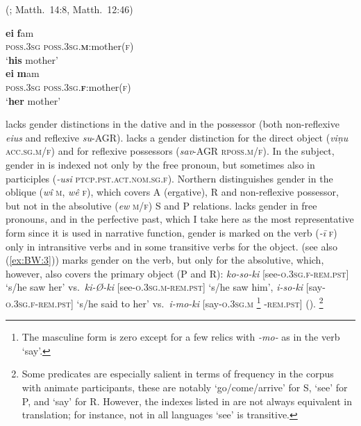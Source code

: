\documentclass[output=collectionpaper]{langsci/langscibook}
\begin{document}
\ea\label{ex:BW:15}
 (; Matth.~14:8, Matth.~12:46)\\
\begin{xlist}
\ex
\gll \textbf{ei} 	\textbf{f}am\\
\textsc{poss.3sg}	\textsc{poss.3sg.\textbf{m}}:mother(\textsc{f})\\
\glt ‘\textbf{his} mother’\\
\ex
\gll \textbf{ei} 	\textbf{m}am\\
\textsc{poss.3sg}	\textsc{poss.3sg.\textbf{f}}:mother(\textsc{f})\\
\glt ‘\textbf{her} mother’\\
\end{xlist}
\z

 lacks gender distinctions in the dative and in the possessor (both non-reflexive \textit{eius} and reflexive \textit{su}-AGR).  lacks a gender distinction for the direct object (\textit{viņu} \textsc{acc.sg.m/f}) and for reflexive possessors (\textit{sav}-AGR \textsc{rposs.m/f}). In the subject, gender in  is indexed not only by the free pronoun, but sometimes also in participles (\textit{-usi} \textsc{ptcp.pst.act.nom.sg.f}). Northern  distinguishes gender in the oblique (\textit{wî} \textsc{m}, \textit{wê} \textsc{f}), which covers A (ergative), R and non-reflexive possessor, but not in the absolutive (\textit{ew} \textsc{m/f}) S and P relations.  lacks gender in free pronouns, and in the perfective past, which I take here as the most representative form since it is used in narrative function, gender is marked on the verb (\textit{-ī} \textsc{f}) only in intransitive verbs and in some transitive verbs for the object.  (see also (\ref{ex:BW:3})) marks gender on the verb, but only for the absolutive, which, however, also covers the primary object (P and R): \textit{ko-so-ki} [see-\textsc{o.3sg.f-rem.pst}] ‘s/he saw her’ vs.\ \textit{ki-Ø-ki} [see-\textsc{o.3sg.m-rem.pst}] ‘s/he saw him’, \textit{i-so-ki} [say-\textsc{o.3sg.f-rem.pst}] ‘s/he said to her’ vs.\ \textit{i-mo-ki} [say-\textsc{o.3sg.m}%
\footnote{%
The masculine form is zero except for a few relics with \textit{-mo-} as in the verb ‘say’.
}%
\textsc{-rem.pst}] (\citealt{Arsjoe1999}).%
\footnote{%
Some predicates are especially salient in terms of frequency in the corpus with animate participants, these are notably ‘go/come/arrive’ for S, ‘see’ for P, and ‘say’ for R. However, the indexes listed in  are not always equivalent in translation; for instance, not in all languages ‘see’ is transitive.
}%
\end{document}

